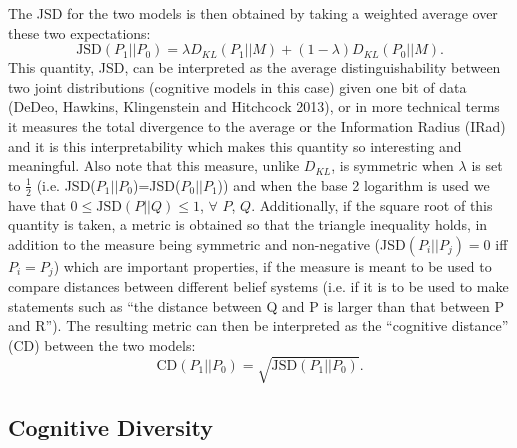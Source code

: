 \documentclass[11pt]{article}
\begin{document}
The JSD for the two models is then obtained by taking a weighted average over these two expectations:
\begin{equation} \label{eq:jsd}
\text{JSD}(P_1 | | P_0)=\lambda D_{KL}(P_1 | | M) + (1-\lambda) D_{KL}(P_0 | | M).
\end{equation}
This quantity, JSD, can be interpreted as the average distinguishability between two joint distributions (cognitive models in this case) given one bit of data (DeDeo, Hawkins, Klingenstein and Hitchcock 2013), or in more technical terms it measures the total divergence to the average or the Information Radius (IRad) and it is this interpretability which makes this quantity so interesting and meaningful. Also note that this measure, unlike $D_{KL}$, is symmetric when $\lambda$ is set to $\frac{1}{2}$ (i.e. JSD($P_1 | | P_0$)=JSD($P_0 | | P_1$)) and when the base 2 logarithm is used we have that $0 \leq \text{JSD}(P | | Q) \leq 1$, $\forall$ $P$, $Q$. Additionally, if the square root of this quantity is taken, a metric is obtained so that the triangle inequality holds, in addition to the measure being symmetric and non-negative (JSD$(P_i || P_j)=0$ iff $P_i=P_j$) which are important properties, if the measure is meant to be used to compare distances between different belief systems (i.e. if it is to be used to make statements such as ``the distance between Q and P is larger than that between P and R''). The resulting metric can then be interpreted as the ``cognitive distance'' (CD) between the two models:
\begin{equation} \label{eq:distance}
\text{CD}(P_1 || P_0)=\sqrt{\text{JSD}(P_1 || P_0)}.
\end{equation}
\subsection{Cognitive Diversity}
\label{sec-3-3}
\end{document}

